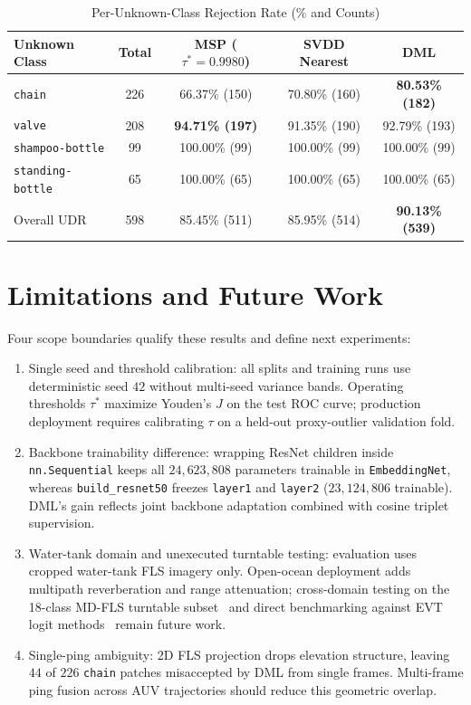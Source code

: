 \documentclass[conference]{IEEEtran}
\begin{document}
\begin{table}[!htbp]
\centering
\caption{Per-Unknown-Class Rejection Rate ($\%$ and Counts)}
\label{tab:per_unknown}
\footnotesize
\setlength{\tabcolsep}{3pt}
\begin{tabular}{@{}lcccc@{}}
\toprule
Unknown Class & Total & MSP ($\tau^*=0.9980$) & SVDD Nearest & DML \\
\midrule
\texttt{chain}           & 226 & 66.37\% (150) & 70.80\% (160) & \textbf{80.53\% (182)} \\
\texttt{valve}           & 208 & \textbf{94.71\% (197)} & 91.35\% (190) & 92.79\% (193) \\
\texttt{shampoo-bottle}  & 99  & 100.00\% (99) & 100.00\% (99) & 100.00\% (99) \\
\texttt{standing-bottle} & 65  & 100.00\% (65) & 100.00\% (65) & 100.00\% (65) \\
\midrule
Overall UDR              & 598 & 85.45\% (511) & 85.95\% (514) & \textbf{90.13\% (539)} \\
\bottomrule
\end{tabular}
\end{table}

\section{Limitations and Future Work}
\label{sec:limits}

Four scope boundaries qualify these results and define next experiments:
\begin{enumerate}
    \item Single seed and threshold calibration: all splits and training runs use deterministic seed $42$ without multi-seed variance bands. Operating thresholds $\tau^*$ maximize Youden's $J$ on the test ROC curve; production deployment requires calibrating $\tau$ on a held-out proxy-outlier validation fold.
    \item Backbone trainability difference: wrapping ResNet children inside \texttt{nn.Sequential} keeps all $24,623,808$ parameters trainable in \texttt{EmbeddingNet}, whereas \texttt{build\_resnet50} freezes \texttt{layer1} and \texttt{layer2} ($23,124,806$ trainable). DML's gain reflects joint backbone adaptation combined with cosine triplet supervision.
    \item Water-tank domain and unexecuted turntable testing: evaluation uses cropped water-tank FLS imagery only. Open-ocean deployment adds multipath reverberation and range attenuation; cross-domain testing on the 18-class MD-FLS turntable subset~\cite{valdenegro_2025_datasets} and direct benchmarking against EVT logit methods~\cite{bendale_2016_openmax,li_2026_copenmax} remain future work.
    \item Single-ping ambiguity: 2D FLS projection drops elevation structure, leaving $44$ of $226$ \texttt{chain} patches misaccepted by DML from single frames. Multi-frame ping fusion across AUV trajectories should reduce this geometric overlap.
\end{enumerate}
\end{document}

